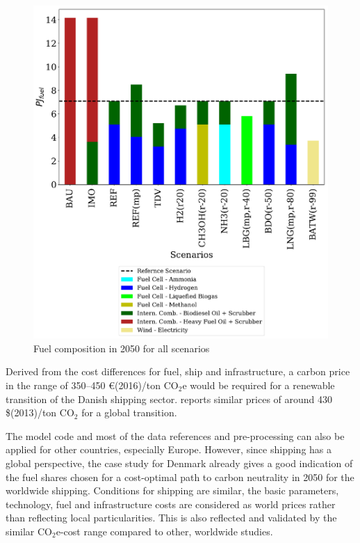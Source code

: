 \documentclass[article]{elsarticle}
\begin{document}
\begin{figure}[htb]
    \centering
    \includegraphics[width=\textwidth]{figures/AllFuel2050.pdf}
    \caption{Fuel composition in 2050 for all scenarios}
    \label{fig:AllFuel2050}
\end{figure}


Derived from the cost differences for fuel, ship and infrastructure, a carbon price in the range of 350--450 \euro(2016)/ton CO$_2$e would be required for a renewable transition of the Danish shipping sector. \citep[p.197]{Raucci2017} reports similar prices of around 430 \$(2013)/ton CO$_2$ for a global transition.

The model code and most of the data references and pre-processing can also be applied for other countries, especially Europe. However, since shipping has a global perspective, the case study for Denmark already gives a good indication of the fuel shares chosen for a cost-optimal path to carbon neutrality in 2050 for the worldwide shipping. Conditions for shipping are similar, the basic parameters, technology, fuel and infrastructure costs are considered as world prices rather than reflecting local particularities. This is also reflected and validated by the similar CO$_2$e-cost range compared to other, worldwide studies. 
\end{document}
